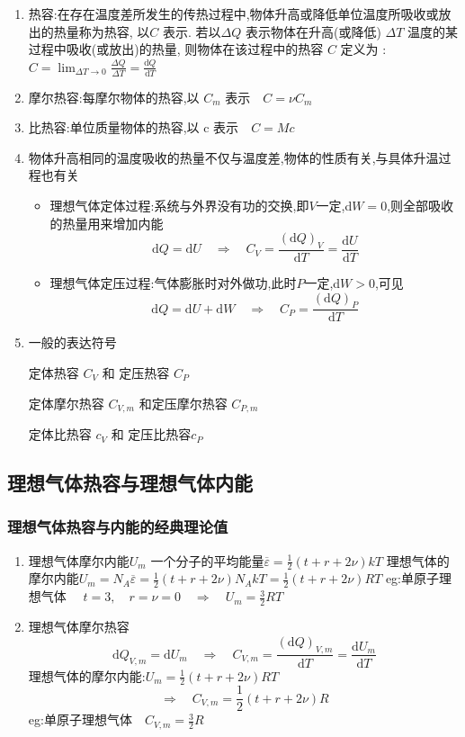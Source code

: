\documentclass{article}
\begin{document}
\begin{enumerate}
    \item 热容:在存在温度差所发生的传热过程中,物体升高或降低单位温度所吸收或放出的热量称为热容,
    以$C$ 表示. 若以$\Delta Q$ 表示物体在升高(或降低) $\Delta T$ 温度的某过程中吸收(或放出)的热量,
    则物体在该过程中的热容 $C$ 定义为 :$C=\lim_{\Delta T\to0}\frac{\Delta Q}{\Delta T}=\frac{\mathrm{d}Q}{\mathrm{d}T}$   
    \item 摩尔热容:每摩尔物体的热容,以 $C_m$ 表示$\quad C=\nu C_m$
    \item 比热容:单位质量物体的热容,以 c 表示$\quad C=Mc$
    \item 物体升高相同的温度吸收的热量不仅与温度差,物体的性质有关,与具体升温过程也有关
    \begin{itemize}
        \item 理想气体定体过程:系统与外界没有功的交换,即$V$一定,d$W=0$,则全部吸收的热量用来增加内能
        $$\mathrm{d}Q=\mathrm{d}U\quad\Rightarrow\quad C_V=\frac{(\mathrm{d}Q)_V}{\mathrm{d}T}=\frac{\mathrm{d}U}{\mathrm{d}T}$$
        \item 理想气体定压过程:气体膨胀时对外做功,此时$P$一定,d$W>0$,可见
        $$\mathrm{d}Q=\mathrm{d}U+\mathrm{d}W\quad\Rightarrow\quad C_P=\frac{(\mathrm{d}Q)_P}{\mathrm{d}T}$$
    \end{itemize}

    \item 一般的表达符号

定体热容 $C_V$  和 定压热容 $C_P$ 

定体摩尔热容 $C_{V,m}$  和定压摩尔热容 $C_{P,m}$

定体比热容 $c_V$  和 定压比热容$ c_P$

\end{enumerate}

\subsection{理想气体热容与理想气体内能}

\subsubsection{理想气体热容与内能的经典理论值}

\begin{enumerate}
    \item 理想气体摩尔内能$U_m $
    一个分子的平均能量$\overline{\varepsilon}=\frac{1}{2}(t+r+2\nu)kT$
    理想气体的摩尔内能$U_m=N_A\overline{\varepsilon}=\frac{1}{2}(t+r+2\nu)N_AkT=\frac{1}{2}(t+r+2\nu)RT$
    eg:单原子理想气体 $\quad t=3,\quad r=\nu=0\quad\Rightarrow\quad U_m=\frac{3}{2}RT$
    \item 理想气体摩尔热容
    $$\mathrm{d}Q_{V,m}=\mathrm{d}U_m\quad\Rightarrow\quad C_{V,m}=\frac{(\mathrm{d}Q)_{V,m}}{\mathrm{d}T}=\frac{\mathrm{d}U_m}{\mathrm{d}T}$$
    理想气体的摩尔内能:$U_m=\frac{1}{2}(t+r+2\nu)RT$
    $$\Rightarrow\quad C_{V,m}=\frac{1}{2}(t+r+2\nu)R$$
    eg:单原子理想气体$\quad C_{V,m}=\frac{3}{2}R$
\end{enumerate}
\end{document}
